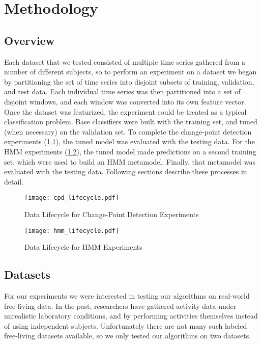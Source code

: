 \chapter{Methodology}
\section{Overview}
Each dataset that we tested consisted of multiple time series gathered from
a number of different subjects, so to perform an experiment on a dataset we began by
partitioning the set of time series into disjoint subsets of training, validation,
and test data. Each individual time series was then partitioned into
a set of disjoint windows, and each window was converted into its own feature vector. Once the dataset was
featurized, the experiment could be treated as a typical classification problem.
Base classifiers were built with the training set, and tuned (when necessary)
on the validation set. 
To complete the change-point detection experiments (\ref{fig:cpd_lifecycle}),
the tuned model was evaluated with the testing data. For the HMM experiments
(\ref{fig:hmm_lifecycle}), the tuned model made predictions on a
second training set, which were used to build an HMM metamodel. Finally, that
metamodel was evaluated with the testing data. Following sections describe these
processes in detail.

\begin{figure}
 \centering
 \texttt{[image: cpd\_lifecycle.pdf]}
 \caption{Data Lifecycle for Change-Point Detection Experiments}
 \label{fig:cpd_lifecycle}
\end{figure}

\begin{figure}
 \centering
 \texttt{[image: hmm\_lifecycle.pdf]}
 \caption{Data Lifecycle for HMM Experiments}
 \label{fig:hmm_lifecycle}
\end{figure}

\section{Datasets}
For our experiments we were interested in testing our algorithms on real-world free-living
data. In the past, researchers have gathered activity data under unrealistic
laboratory conditions, and by performing activities themselves instead of using
independent subjects.
Unfortunately there are not many such labeled free-living datasets available,
so we only tested our algorithms on two datasets.

